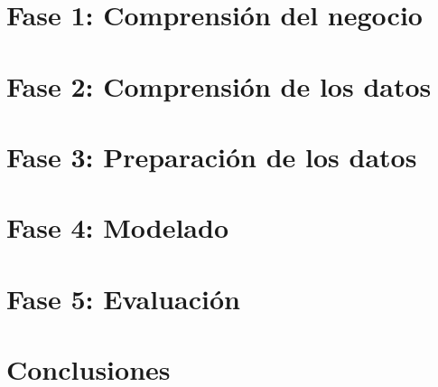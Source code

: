 



	
	\newpage

	\tableofcontents
	\newpage

	\graphicspath{{../doc/report/pics/}}

	\section{Fase 1: Comprensión del negocio}
		

	\newpage
	\section{Fase 2: Comprensión de los datos}
		

	\newpage
	\section{Fase 3: Preparación de los datos}
		

	\newpage
	\section{Fase 4: Modelado}
		

	\newpage
	\section{Fase 5: Evaluación}
		

	\newpage
	\section{Conclusiones}
		

